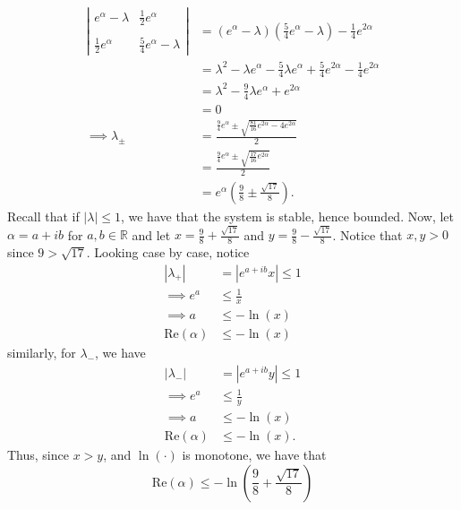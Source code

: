 \documentclass{article}
\begin{document}
\begin{itemize}
    \begin{align*}
        \left|\begin{matrix}
            e^{\alpha} - \lambda & \tfrac{1}{2}e^{\alpha}\\
            \\
            \tfrac{1}{2}e^{\alpha} & \tfrac{5}{4}e^{\alpha} - \lambda
        \end{matrix}\right| &= (e^{\alpha} - \lambda)(\tfrac{5}{4}e^{\alpha} - \lambda) - \tfrac{1}{4}e^{2\alpha}\\
        &= \lambda^2 - \lambda e^{\alpha} - \tfrac{5}{4}\lambda e^{\alpha} + \tfrac{5}{4}e^{2\alpha} - \tfrac{1}{4}e^{2\alpha}\\
        &= \lambda^2 - \tfrac{9}{4}\lambda e^{\alpha} + e^{2\alpha}\\
        &= 0\\
        \implies \lambda_{\pm} &= \frac{\tfrac{9}{4}e^{\alpha} \pm \sqrt{\tfrac{81}{16}e^{2\alpha} - 4e^{2\alpha}}}{2}\\
        &= \frac{\tfrac{9}{4}e^{\alpha} \pm \sqrt{\tfrac{17}{16}e^{2\alpha}}}{2}\\
        &= e^{\alpha} \left(\frac{9}{8} \pm \frac{\sqrt{17}}{8}\right).
    \end{align*}
    Recall that if $|\lambda| \leq 1$, we have that the system is stable, hence bounded. Now, let $\alpha = a + ib$ for $a,b \in \mathbb{R}$ and let $x = \tfrac{9}{8} + \tfrac{\sqrt{17}}{8}$ and $y = \tfrac{9}{8} - \tfrac{\sqrt{17}}{8}$.
    Notice that $x,y > 0$ since $9 > \sqrt{17}$. Looking case by case, notice
    \begin{align*}
        |\lambda_+| &= |e^{a + ib}x| \leq 1\\
        \implies e^a &\leq \frac{1}{x}\\
        \implies a &\leq -\ln(x) \tag{$\ln(\cdot)$ monotone}\\
        \text{Re}(\alpha) &\leq -\ln(x)
    \end{align*}
    similarly, for $\lambda_-$, we have
    \begin{align*}
        |\lambda_-| &= |e^{a + ib}y| \leq 1\\
        \implies e^a &\leq \frac{1}{y}\\
        \implies a &\leq -\ln(x) \tag{$\ln(\cdot)$ monotone}\\
        \text{Re}(\alpha) &\leq -\ln(x).
    \end{align*}
    Thus, since $x > y$, and $\ln(\cdot)$ is monotone, we have that 
    \[\text{Re}(\alpha) \leq -\ln\left(\frac{9}{8} + \frac{\sqrt{17}}{8}\right)\]

\end{itemize}
\end{document}
